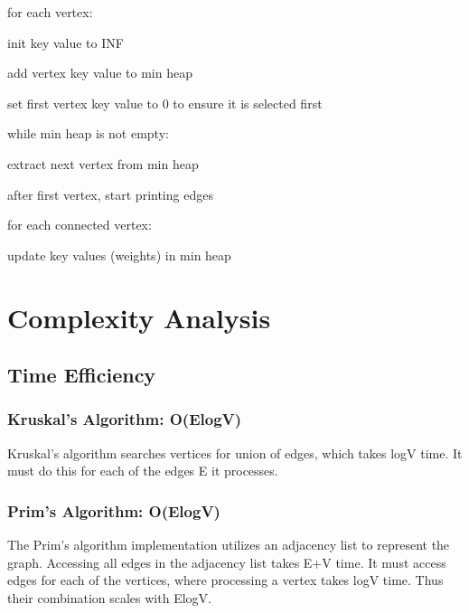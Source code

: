 \documentclass{article}
\begin{document}
\hspace{\parindent}for each vertex:

\hspace{\parindent}\hspace{\parindent}init key value to INF

\hspace{\parindent}\hspace{\parindent}add vertex key value to min heap

\hspace{\parindent}set first vertex key value to 0 to ensure it is selected first

\hspace{\parindent}while min heap is not empty:

\hspace{\parindent}\hspace{\parindent}extract next vertex from min heap

\hspace{\parindent}\hspace{\parindent}after first vertex, start printing edges

\hspace{\parindent}\hspace{\parindent}for each connected vertex:

\hspace{\parindent}\hspace{\parindent}\hspace{\parindent}update key values (weights) in min heap

\newpage
\section{Complexity Analysis}

\subsection{Time Efficiency}
\subsubsection[Kruskal's Algorithm]{Kruskal's Algorithm: O(ElogV)}
Kruskal's algorithm searches vertices for union of edges, which takes logV time. It must do this for each of the edges E it processes.
\subsubsection[Prim's Algorithm]{Prim's Algorithm: O(ElogV)}
The Prim's algorithm implementation utilizes an adjacency list to represent the graph. Accessing all edges in the adjacency list takes E+V time. It must access edges for each of the vertices, where processing a vertex takes logV time. Thus their combination scales with ElogV.
\end{document}
